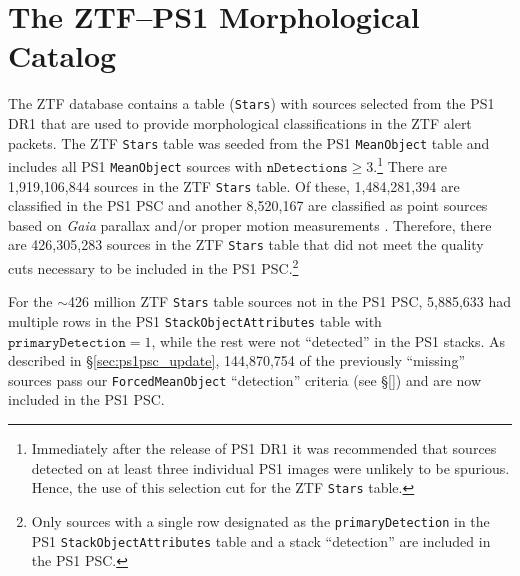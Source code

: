 \documentclass[twocolumn]{aastex63}
\begin{document}


\appendix

\section{The ZTF--PS1 Morphological Catalog}\label{app:cat_counts}

The ZTF database contains a table (\texttt{Stars}) with sources selected from
the PS1 DR1 that are used to provide morphological classifications in the ZTF
alert packets. The ZTF \texttt{Stars} table was seeded from the PS1
\texttt{MeanObject} table and includes all PS1 \texttt{MeanObject} sources
with $\mathtt{nDetections} \ge 3$.\footnote{Immediately after the release of
PS1 DR1 it was recommended that sources detected on at least three individual
PS1 images were unlikely to be spurious. Hence, the use of this selection cut
for the ZTF \texttt{Stars} table.} There are 1,919,106,844 sources in the ZTF
\texttt{Stars} table. Of these, 1,484,281,394 are classified in the PS1 PSC
and another 8,520,167 are classified as point sources based on \textit{Gaia}
parallax and/or proper motion measurements \citep{Tachibana18}. Therefore,
there are 426,305,283 sources in the ZTF \texttt{Stars} table that did not
meet the quality cuts necessary to be included in the PS1 PSC.\footnote{Only
sources with a single row designated as the \texttt{primaryDetection} in the
PS1 \texttt{StackObjectAttributes} table and a stack ``detection''
\citep[i.e., the PSF, Kron, and aperture flux are all $>0$ in at least one
filter, see][]{Tachibana18} are included in the PS1 PSC. }

For the $\sim$426 million ZTF \texttt{Stars} table sources not in the PS1 PSC,
5,885,633 had multiple rows in the PS1 \texttt{StackObjectAttributes} table
with $\mathtt{primaryDetection} = 1$, while the rest were not ``detected'' in
the PS1 stacks. As described in \S\ref{sec:ps1psc_update}, 144,870,754 of the
previously ``missing'' sources pass our \texttt{ForcedMeanObject}
``detection'' criteria (see \S\ref{}) and are now included in the PS1 PSC. 
\end{document}
